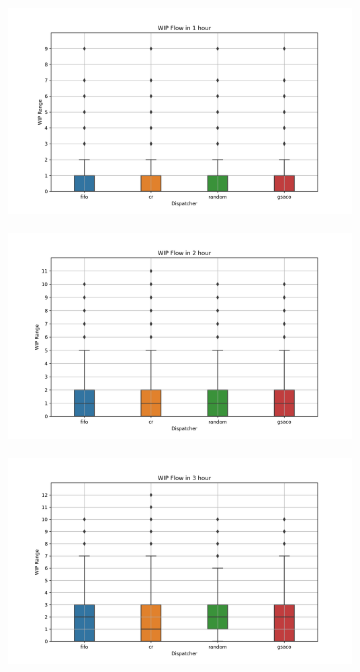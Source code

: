 \begin{figure}[t]
	\centering
	\begin{subfigure}[b]{0.32\textwidth}
		\includegraphics[width=\textwidth]{HVLM/period_3600s.png}
	\end{subfigure}
	\hfill
	\begin{subfigure}[b]{0.32\textwidth}
		\includegraphics[width=\textwidth]{HVLM/period_7200s.png}
	\end{subfigure}
	\hfill
	\begin{subfigure}[b]{0.32\textwidth}
		\includegraphics[width=\textwidth]{HVLM/period_10800s.png}
	\end{subfigure}
	

\end{figure}
